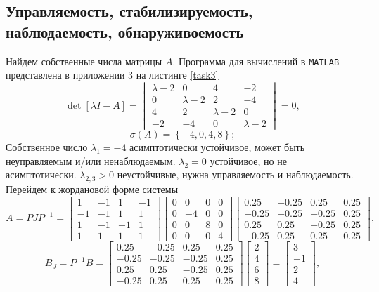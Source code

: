 \documentclass[a4paper, 12pt]{article}
\begin{document}
    \subsection{Управляемость, стабилизируемость, наблюдаемость, обнаруживоемость}
    Найдем собственные числа матрицы $A$. Программа для вычислений в \texttt{MATLAB} представлена
    в приложении 3 на листинге \ref{task3}
    $$
    \det{\left[\lambda I-A\right]}=\begin{vmatrix}     
    \lambda-2	  &0	  &4	 &-2\\
    0	&\lambda-2	  &2	 &-4\\
    4	  &2	&\lambda-2	  &0\\
    -2	 &-4	  &0	&\lambda-2
    \end{vmatrix}=0,
    $$
    $$
    \sigma\left(A\right)=\left\{-4,0,4,8\right\};
    $$
    Собственное число $\lambda_1=-4$ асимптотически устойчивое, может быть неуправляемым и/или ненаблюдаемым.
    $\lambda_2=0$ устойчивое, но не асимптотически.
    $\lambda_{2,3}>0$ неустойчивые, нужна управляемость и наблюдаемость.
    Перейдем к жордановой форме системы
    $$A=PJP^{-1}=\begin{bmatrix}
    1    &-1     &1    &-1\\
    -1    &-1     &1     &1\\
     1    &-1    &-1     &1\\
     1     &1     &1     &1
    \end{bmatrix}\begin{bmatrix}
    0     &0     &0     &0\\
    0    &-4     &0     &0\\
    0     &0     &8     &0\\
    0     &0     &0     &4
    \end{bmatrix}\begin{bmatrix}
    0.25   &-0.25    &0.25    &0.25\\
   -0.25   &-0.25   &-0.25    &0.25\\
    0.25    &0.25   &-0.25    &0.25\\
   -0.25    &0.25    &0.25    &0.25
    \end{bmatrix},$$
    $$
    B_{J}=P^{-1}B=\begin{bmatrix}
        0.25   &-0.25    &0.25    &0.25\\
        -0.25   &-0.25   &-0.25    &0.25\\
         0.25    &0.25   &-0.25    &0.25\\
        -0.25    &0.25    &0.25    &0.25
    \end{bmatrix}\begin{bmatrix}
        2\\
        4\\
        6\\
        8
    \end{bmatrix}=\begin{bmatrix}
        3\\
    -1\\
     2\\
     4
    \end{bmatrix},
    $$
\end{document}
